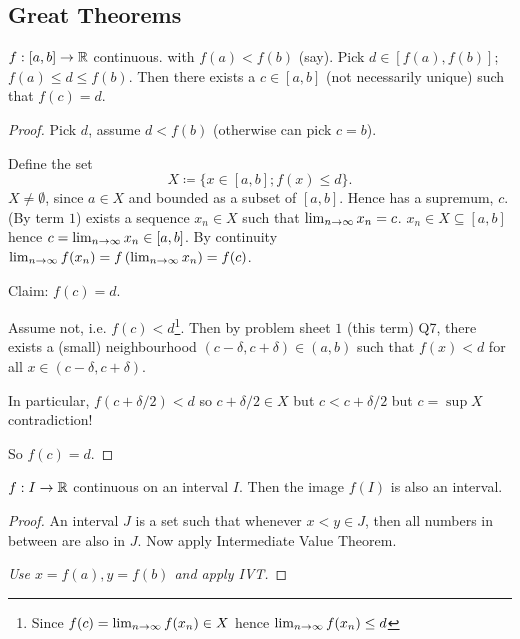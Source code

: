 \documentclass[10pt, a4paper]{article}
\begin{document}
\subsection{Great Theorems}
\begin{theorem}
    $f : [a, b] \rightarrow \mathbb{R}$ continuous.
    with $f(a) < f(b)$
    (say).
    Pick $d \in [f(a), f(b)]$;
    $f(a) \leq d \leq f(b)$.
    Then there exists a $c \in [a, b]$
    (not necessarily unique)
    such that $f(c) = d$.
    \begin{proof}
        Pick $d$,
        assume $d < f(b)$
        (otherwise can pick $c = b$).
        
        Define the set
        \[
        X \coloneqq \{x \in [a, b]; f(x) \leq d\}.
        \]
        $X \neq \emptyset$,
        since $a \in X$ and bounded as a subset of $[a, b]$.
        Hence has a supremum,
        $c$.
        (By term $1$)
        exists a sequence $x_n \in X$ such that $\lim_{n \rightarrow \infty} x_n = c$.
        $x_n \in X \subseteq [a, b]$ hence $c = \lim_{n \rightarrow \infty} x_n \in [a, b]$.
        By continuity $\lim_{n \rightarrow \infty} f(x_n) = f\left(\lim_{n \rightarrow \infty} x_n\right) = f(c)$.

        Claim:
        $f(c) = d$.

        Assume not,
        i.e. $f(c) < d$\footnote{Since $f(c) = \lim_{n \rightarrow \infty} f(x_n) \in X$ hence $\lim_{n \rightarrow \infty} f(x_n) \leq d$}.
        Then by problem sheet $1$
        (this term)
        Q7,
        there exists a
        (small)
        neighbourhood $(c - \delta, c + \delta) \in (a, b)$ such that $f(x) < d$ for all $x \in (c - \delta, c + \delta)$.

        In particular, $f(c + \delta / 2) < d$ so $c + \delta / 2 \in X$
        but $c < c + \delta / 2$ but $c = \sup{X}$ contradiction!

        So $f(c) =  d$.
    \end{proof}
\end{theorem}

\begin{corollary}
    $f : I \rightarrow \mathbb{R}$ continuous on an interval $I$.
    Then the image $f(I)$ is also an interval.
    
    \begin{proof}
        An interval $J$ is a set such that whenever $x < y \in J$,
        then all numbers in between are also in $J$.
        Now apply Intermediate Value Theorem.

        \textit{Use $x = f(a), y = f(b)$ and apply IVT.}
    \end{proof}
\end{corollary}
\end{document}
